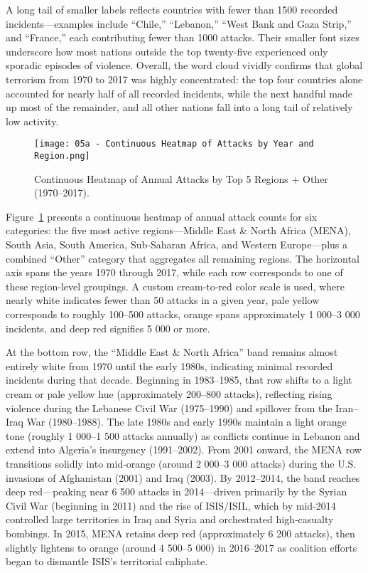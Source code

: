 A long tail of smaller labels reflects countries with fewer than 1500 recorded incidents—examples include “Chile,” “Lebanon,” “West Bank and Gaza Strip,” and “France,” each contributing fewer than 1000 attacks. Their smaller font sizes underscore how most nations outside the top twenty-five experienced only sporadic episodes of violence. Overall, the word cloud vividly confirms that global terrorism from 1970 to 2017 was highly concentrated: the top four countries alone accounted for nearly half of all recorded incidents, while the next handful made up most of the remainder, and all other nations fall into a long tail of relatively low activity.

\vspace{0.5em}
\begin{figure}[ht]
  \centering
  \texttt{[image: 05a - Continuous Heatmap of Attacks by Year and Region.png]}
  \caption{Continuous Heatmap of Annual Attacks by Top 5 Regions + Other (1970–2017).}
  \label{fig:heatmap_regions}
\end{figure}

Figure~\ref{fig:heatmap_regions} presents a continuous heatmap of annual attack counts for six categories: the five most active regions—Middle East \& North Africa (MENA), South Asia, South America, Sub‐Saharan Africa, and Western Europe—plus a combined “Other” category that aggregates all remaining regions. The horizontal axis spans the years 1970 through 2017, while each row corresponds to one of these region‐level groupings. A custom cream‐to‐red color scale is used, where nearly white indicates fewer than 50 attacks in a given year, pale yellow corresponds to roughly 100–500 attacks, orange spans approximately 1 000–3 000 incidents, and deep red signifies 5 000 or more.

At the bottom row, the “Middle East \& North Africa” band remains almost entirely white from 1970 until the early 1980s, indicating minimal recorded incidents during that decade. Beginning in 1983–1985, that row shifts to a light cream or pale yellow hue (approximately 200–800 attacks), reflecting rising violence during the Lebanese Civil War (1975–1990) and spillover from the Iran–Iraq War (1980–1988). The late 1980s and early 1990s maintain a light orange tone (roughly 1 000–1 500 attacks annually) as conflicts continue in Lebanon and extend into Algeria’s insurgency (1991–2002). From 2001 onward, the MENA row transitions solidly into mid‐orange (around 2 000–3 000 attacks) during the U.S. invasions of Afghanistan (2001) and Iraq (2003). By 2012–2014, the band reaches deep red—peaking near 6 500 attacks in 2014—driven primarily by the Syrian Civil War (beginning in 2011) and the rise of ISIS/ISIL, which by mid‐2014 controlled large territories in Iraq and Syria and orchestrated high‐casualty bombings. In 2015, MENA retains deep red (approximately 6 200 attacks), then slightly lightens to orange (around 4 500–5 000) in 2016–2017 as coalition efforts began to dismantle ISIS’s territorial caliphate.

